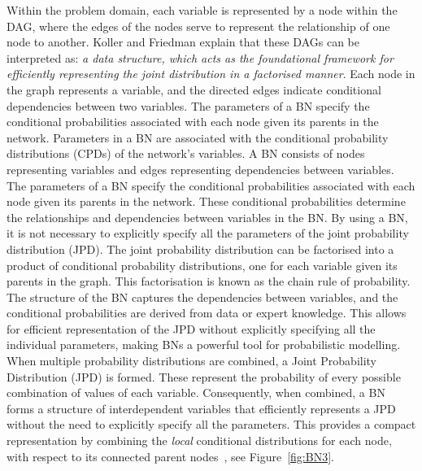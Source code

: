 \documentclass[journal]{IEEEtran}
\begin{document}
Within the problem domain, each variable is represented by a node within the DAG, where the edges of the nodes serve to represent the relationship of one node to another. Koller and Friedman explain that these DAGs can be interpreted as: \textit{a data structure, which acts as the foundational framework for efficiently representing the joint distribution in a factorised manner}. Each node in the graph represents a variable, and the directed edges indicate conditional dependencies between two variables. The parameters of a BN specify the conditional probabilities associated with each node given its parents in the network. Parameters in a BN are associated with the conditional probability distributions (CPDs) of the network's variables. A BN consists of nodes representing variables and edges representing dependencies between variables. The parameters of a BN specify the conditional probabilities associated with each node given its parents in the network. These conditional probabilities determine the relationships and dependencies between variables in the BN. By using a BN, it is not necessary to explicitly specify all the parameters of the joint probability distribution (JPD). The joint probability distribution can be factorised into a product of conditional probability distributions, one for each variable given its parents in the graph. This factorisation is known as the chain rule of probability. The structure of the BN captures the dependencies between variables, and the conditional probabilities are derived from data or expert knowledge. This allows for efficient representation of the JPD without explicitly specifying all the individual parameters, making BNs a powerful tool for probabilistic modelling. When multiple probability distributions are combined, a Joint Probability Distribution (JPD) is formed. These represent the probability of every possible combination of values of each variable. Consequently, when combined, a BN forms a structure of interdependent variables that efficiently represents a JPD without the need to explicitly specify all the parameters. This provides a compact representation by combining the \textit{local} conditional distributions for each node, with respect to its connected parent nodes~\cite{Koller2009ProbabilisticTechniques}, see Figure~\ref{fig:BN3}.
\end{document}
